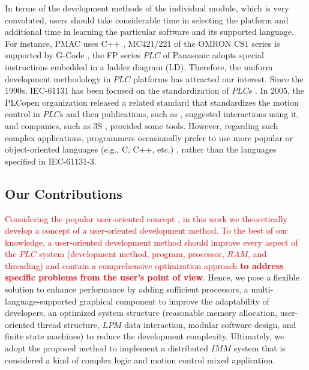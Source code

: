 \documentclass[journal,UTF8]{IEEEtran}
\begin{document}
	In terms of the development methods of the individual module, which is very convoluted, users should take considerable time in selecting the platform and additional time in learning the particular software and its supported language. For instance, PMAC uses C++ \cite{Peng2011Linear,Qian2014A}, MC421/221 of the OMRON CS1 series is supported by G-Code \cite{OMRON2006CS1W}, the FP series $PLC$ of Panasonic adopts special instructions embedded in  a ladder diagram (LD). Therefore, the uniform development methodology in $PLC$ platforms has attracted our interest. Since the 1990s, IEC-61131 has been focused on the standardization of $PLC$s \cite{IEC1993Programmable}. In 2005, the PLCopen organization released a related standard \cite{PLCopen2005Function} that standardizes the motion control in $PLC$s and then publications, such as \cite{S2006Advanced}, suggested interactions using it, and companies, such as 3S \cite{3S2017Logic}, provided some tools. However, regarding such complex applications, programmers occasionally prefer to use more popular or object-oriented languages (e.g., C, C++, etc.) \cite{Bonfe2001Object, Werner2009Object, Basile2013On}, rather than the languages specified in IEC-61131-3. 
	
	
	\subsection{Our Contributions}
	\textcolor{red}{Considering the popular user-oriented concept \cite{Verscheure2016User, Choi2017A}, in this work we theoretically develop a concept of a user-oriented development method. To the best of our knowledge, a user-oriented development method should improve every aspect of the $PLC$ system (development method, program, processor, $RAM$, and threading) and contain a comprehensive optimization approach \textbf{to address specific problems from the user's point of view}.} Hence, we pose a flexible solution to enhance performance by adding sufficient processors, a multi-language-supported graphical component to improve the adaptability of developers, an optimized system structure (reasonable memory allocation, user-oriented thread structure, $LPM$ data interaction, modular software design, and finite state machines) to reduce the development complexity. Ultimately, we adopt the proposed method to implement a distributed $IMM$ system that is considered a kind of complex logic and motion control mixed application.
	
\end{document}
